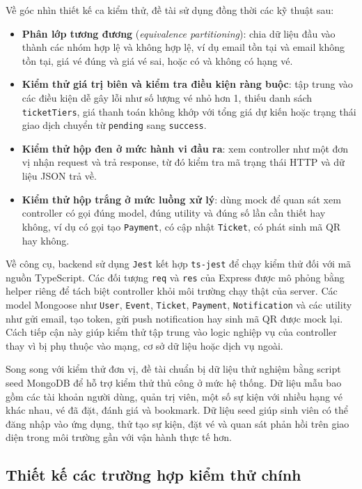 \documentclass[../DoAn.tex]{subfiles}
\begin{document}
Về góc nhìn thiết kế ca kiểm thử, đề tài sử dụng đồng thời các kỹ thuật sau:

\begin{itemize}
    \item \textbf{Phân lớp tương đương} (\textit{equivalence partitioning}): chia dữ liệu đầu vào thành các nhóm hợp lệ và không hợp lệ, ví dụ email tồn tại và email không tồn tại, giá vé đúng và giá vé sai, hoặc có và không có hạng vé.
    \item \textbf{Kiểm thử giá trị biên và kiểm tra điều kiện ràng buộc}: tập trung vào các điều kiện dễ gây lỗi như số lượng vé nhỏ hơn 1, thiếu danh sách \texttt{ticketTiers}, giá thanh toán không khớp với tổng giá dự kiến hoặc trạng thái giao dịch chuyển từ \texttt{pending} sang \texttt{success}.
    \item \textbf{Kiểm thử hộp đen ở mức hành vi đầu ra}: xem controller như một đơn vị nhận request và trả response, từ đó kiểm tra mã trạng thái HTTP và dữ liệu JSON trả về.
    \item \textbf{Kiểm thử hộp trắng ở mức luồng xử lý}: dùng mock để quan sát xem controller có gọi đúng model, đúng utility và đúng số lần cần thiết hay không, ví dụ có gọi tạo \texttt{Payment}, có cập nhật \texttt{Ticket}, có phát sinh mã \gls{QR} hay không.
\end{itemize}

Về công cụ, backend sử dụng \texttt{Jest} kết hợp \texttt{ts-jest} để chạy kiểm thử đối với mã nguồn TypeScript. Các đối tượng \texttt{req} và \texttt{res} của Express được mô phỏng bằng helper riêng để tách biệt controller khỏi môi trường chạy thật của server. Các model Mongoose như \texttt{User}, \texttt{Event}, \texttt{Ticket}, \texttt{Payment}, \texttt{Notification} và các utility như gửi email, tạo token, gửi push notification hay sinh mã \gls{QR} được mock lại. Cách tiếp cận này giúp kiểm thử tập trung vào logic nghiệp vụ của controller thay vì bị phụ thuộc vào mạng, cơ sở dữ liệu hoặc dịch vụ ngoài.

Song song với kiểm thử đơn vị, đề tài chuẩn bị dữ liệu thử nghiệm bằng script seed MongoDB để hỗ trợ kiểm thử thủ công ở mức hệ thống. Dữ liệu mẫu bao gồm các tài khoản người dùng, quản trị viên, một số sự kiện với nhiều hạng vé khác nhau, vé đã đặt, đánh giá và bookmark. Dữ liệu seed giúp sinh viên có thể đăng nhập vào ứng dụng, thử tạo sự kiện, đặt vé và quan sát phản hồi trên giao diện trong môi trường gần với vận hành thực tế hơn.

\subsection{Thiết kế các trường hợp kiểm thử chính}
\end{document}
